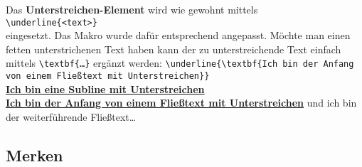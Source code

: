 \documentclass[rgb]{beamer}
\begin{document}
\begin{frame}[t]
	\subsectionpage
	Das \textbf{Unterstreichen-Element} wird wie gewohnt mittels\\
	\hskip 1cm \texttt{\textbackslash underline\{<text>\}}\\
	eingesetzt. Das Makro wurde dafür entsprechend angepasst. Möchte man einen fetten unterstrichenen Text haben kann der zu unterstreichende Text einfach mittels \texttt{\textbackslash textbf\{\ldots\}} ergänzt werden: \texttt{\textbackslash underline\{\textbackslash textbf\{Ich bin der Anfang von einem Fließtext mit Unterstreichen\}\}} \\
	\vskip 18pt
	\underline{\textbf{Ich bin eine Subline mit Unterstreichen}}\\
	\vskip 18pt
	\underline{\textbf{Ich bin der Anfang von einem Fließtext mit Unterstreichen}} und ich bin der weiterführende Fließtext\ldots\\
	\end{frame}


\subsection{Merken}

\end{document}
